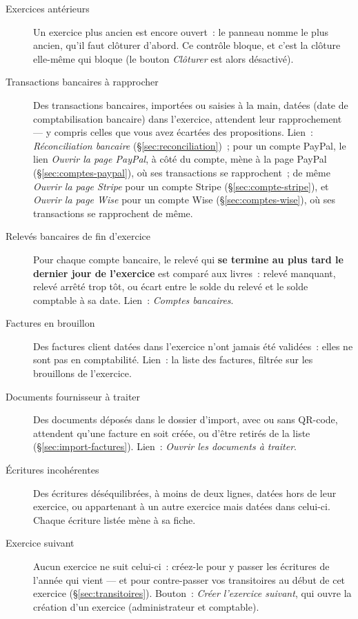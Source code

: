 \documentclass[a4paper,11pt,oneside]{article}
\begin{document}
\begin{description}
    \item[Exercices antérieurs] Un exercice plus ancien est encore ouvert~: le panneau nomme le plus ancien, qu'il faut clôturer d'abord. Ce contrôle bloque, et c'est la clôture elle-même qui bloque (le bouton \emph{Clôturer} est alors désactivé).
    \item[Transactions bancaires à rapprocher] Des transactions bancaires, importées ou saisies à la main, datées (date de comptabilisation bancaire) dans l'exercice, attendent leur rapprochement --- y compris celles que vous avez écartées des propositions. Lien~: \emph{Réconciliation bancaire} (\S\ref{sec:reconciliation})~; pour un compte PayPal, le lien \emph{Ouvrir la page PayPal}, à côté du compte, mène à la page PayPal (\S\ref{sec:comptes-paypal}), où ses transactions se rapprochent~; de même \emph{Ouvrir la page Stripe} pour un compte Stripe (\S\ref{sec:compte-stripe}), et \emph{Ouvrir la page Wise} pour un compte Wise (\S\ref{sec:comptes-wise}), où ses transactions se rapprochent de même.
    \item[Relevés bancaires de fin d'exercice] Pour chaque compte bancaire, le relevé qui \textbf{se termine au plus tard le dernier jour de l'exercice} est comparé aux livres~: relevé manquant, relevé arrêté trop tôt, ou écart entre le solde du relevé et le solde comptable à sa date. Lien~: \emph{Comptes bancaires}.
    \item[Factures en brouillon] Des factures client datées dans l'exercice n'ont jamais été validées~: elles ne sont pas en comptabilité. Lien~: la liste des factures, filtrée sur les brouillons de l'exercice.
    \item[Documents fournisseur à traiter] Des documents déposés dans le dossier d'import, avec ou sans QR-code, attendent qu'une facture en soit créée, ou d'être retirés de la liste (\S\ref{sec:import-factures}). Lien~: \emph{Ouvrir les documents à traiter}.
    \item[Écritures incohérentes] Des écritures déséquilibrées, à moins de deux lignes, datées hors de leur exercice, ou appartenant à un autre exercice mais datées dans celui-ci. Chaque écriture listée mène à sa fiche.
    \item[Exercice suivant] Aucun exercice ne suit celui-ci~: créez-le pour y passer les écritures de l'année qui vient --- et pour contre-passer vos transitoires au début de cet exercice (\S\ref{sec:transitoires}). Bouton~: \emph{Créer l'exercice suivant}, qui ouvre la création d'un exercice (administrateur et comptable).

\end{description}
\end{document}
